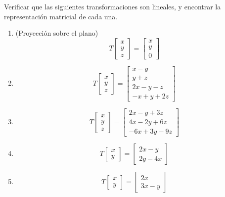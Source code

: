 \begin{resuelto} \label{exe:trans}Verificar que las siguientes transformaciones son lineales, y encontrar la representaci\'on
matricial de cada una.
\begin{enumerate}
 \item (Proyecci\'on sobre el plano)$$
T\begin{bmatrix}
  x \\ y \\z
 \end{bmatrix}
=\begin{bmatrix}
  x \\ y \\0
 \end{bmatrix}
 $$

 \item $$
T\begin{bmatrix}
  x \\ y \\z
 \end{bmatrix}
 =\begin{bmatrix}
  x - y\\ y+z \\ 2x - y - z \\ -x+y+2z
 \end{bmatrix}
 $$

 \item $$
T\begin{bmatrix}
  x \\ y \\z
 \end{bmatrix}
 =\begin{bmatrix}
  2x - y +3z\\ 4x-2y+6z \\ -6x +3 y - 9z
 \end{bmatrix}
 $$

\item$$
T\begin{bmatrix}
  x \\ y
 \end{bmatrix}
 =\begin{bmatrix}
   2x-y\\ 2y-4x
  \end{bmatrix}
$$

\item$$
T\begin{bmatrix}
  x \\ y
 \end{bmatrix}
 =\begin{bmatrix}
   2x \\ 3x-y
  \end{bmatrix}
$$


\end{enumerate}
\end{resuelto}
